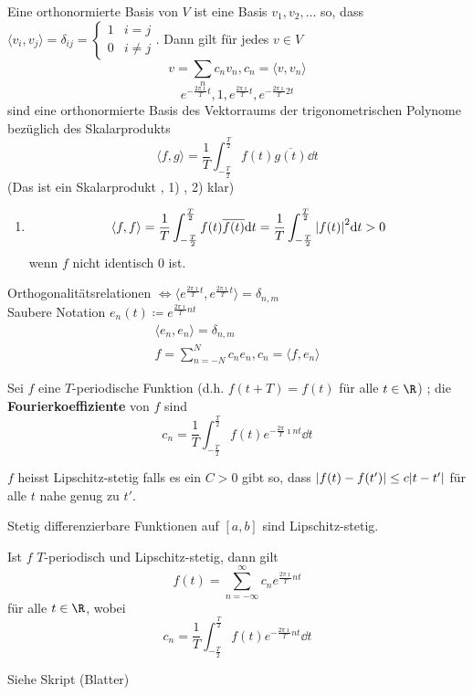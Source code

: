 Eine orthonormierte Basis von $V$ ist eine Basis $v_1, v_2 , \dotsc$ so, dass $\langle v_i , v_j \rangle = \delta_{ij} = \begin{cases} 1 &i = j \\ 0 &i \neq j \end{cases}$. Dann gilt für jedes $v \in V$
\[ v = \sum_n c_n v_n , c_n = \langle v , v_n \rangle \]
\[ e^{-\frac{2\pi\imath}{T} t} , 1 , e^{\frac{2\pi\imath}{T} t} , e^{-\frac{2\pi\imath}{T} 2t} \]
sind eine orthonormierte Basis des Vektorraums der trigonometrischen Polynome bezüglich des Skalarprodukts
\[ \langle f , g \rangle = \frac{1}{T} \int_{-\frac{T}{2}}^{\frac{T}{2}} f(t) \overline{g(t)} \dd t \]
(Das ist ein Skalarprodukt , 1) , 2) klar)
\begin{enumerate}[start=3,label=\arabic*)]
	\item \[ \langle f , f \rangle = \frac{1}{T} \int_{-\frac{T}{2}}^{\frac{T}{2}} f(t) \overline{f(t)} \dd t = \frac{1}{T} \int_{-\frac{T}{2}}^{\frac{T}{2}} \abs{f(t)}^2 \dd t > 0 \] wenn $f$ nicht identisch $0$ ist.
\end{enumerate}
Orthogonalitätsrelationen $\iff \langle e^{\frac{2\pi\imath}{T} t} , e^{\frac{2\pi\imath}{T} t} \rangle = \delta_{n,m}$ \\
Saubere Notation $e_n(t) \coloneqq e^{\frac{2\pi\imath}{T} nt}$
\begin{gather*}
	\langle e_n , e_n \rangle = \delta_{n,m} \\
	f = \sum_{n = -N}^N c_n e_n , c_n = \langle f , e_n \rangle
\end{gather*}
\begin{def*}[note = Fourierkoeffizient , index = Fourier koeffizient , indexformat = {1!~.2}]
	Sei $f$ eine $T$-periodische Funktion (d.h. $f(t+T) = f(t)$ für alle $t \in \R$) ; die \textbf{Fourierkoeffiziente} von $f$ sind
	\[ c_n = \frac{1}{T} \int_{-\frac{T}{2}}^{\frac{T}{2}} f(t) e^{-\frac{2\pi}{T} \imath nt} \dd t \]
\end{def*}
\begin{def*}[note = Lipschitz Stetigkeit , index = Lipschitz stegig , indexformat = {2!1~ }]
	$f$ heisst Lipschitz-stetig falls es ein $C > 0$ gibt so, dass $\abs{f(t) - f(t')} \leq c \abs{t-t'}$ für alle $t$ nahe genug zu $t'$.
\end{def*}
\begin{bsp*}
	Stetig differenzierbare Funktionen auf $[a,b]$ sind Lipschitz-stetig.
\end{bsp*}
\begin{satz*}
	Ist $f$ $T$-periodisch und Lipschitz-stetig, dann gilt
	\[ f(t) = \sum_{n = -\infty}^\infty c_n e^{\frac{2\pi\imath}{T} nt} \]
	für alle $t \in \R$, wobei
	\[ c_n = \frac{1}{T} \int_{-\frac{T}{2}}^{\frac{T}{2}} f(t) e^{-\frac{2\pi\imath}{T} nt} \dd t \]
	\begin{bew}
		Siehe Skript (Blatter)
	\end{bew}
\end{satz*}
